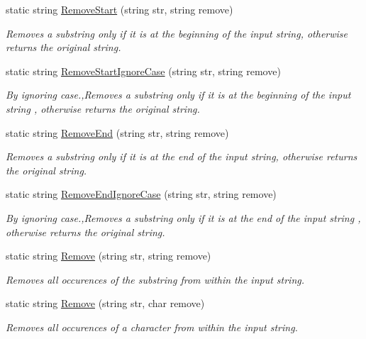 \begin{DoxyCompactItemize}
static string \hyperlink{class_ultimate_1_1_utilities_1_1_string_utils_a5d1a5075d3a15b54171c8b933ce1c494}{Remove\+Start} (string str, string remove)
\begin{DoxyCompactList}\small\item\em Removes a substring only if it is at the beginning of the input string, otherwise returns the original string. \end{DoxyCompactList}\item 
static string \hyperlink{class_ultimate_1_1_utilities_1_1_string_utils_ad31da1afd8821e096abcae497f0c4434}{Remove\+Start\+Ignore\+Case} (string str, string remove)
\begin{DoxyCompactList}\small\item\em By ignoring case.,Removes a substring only if it is at the beginning of the input string , otherwise returns the original string. \end{DoxyCompactList}\item 
static string \hyperlink{class_ultimate_1_1_utilities_1_1_string_utils_a05fdedfda5f6514866e5d73bbe214ce1}{Remove\+End} (string str, string remove)
\begin{DoxyCompactList}\small\item\em Removes a substring only if it is at the end of the input string, otherwise returns the original string. \end{DoxyCompactList}\item 
static string \hyperlink{class_ultimate_1_1_utilities_1_1_string_utils_a27d7f65090c06d9c0376caab6e301ecf}{Remove\+End\+Ignore\+Case} (string str, string remove)
\begin{DoxyCompactList}\small\item\em By ignoring case.,Removes a substring only if it is at the end of the input string , otherwise returns the original string. \end{DoxyCompactList}\item 
static string \hyperlink{class_ultimate_1_1_utilities_1_1_string_utils_a6da32f2a8e831ef0c1788f2f2927d723}{Remove} (string str, string remove)
\begin{DoxyCompactList}\small\item\em Removes all occurences of the substring from within the input string. \end{DoxyCompactList}\item 
static string \hyperlink{class_ultimate_1_1_utilities_1_1_string_utils_a83c2de023df73f0263c6818ade152caa}{Remove} (string str, char remove)
\begin{DoxyCompactList}\small\item\em Removes all occurences of a character from within the input string. \end{DoxyCompactList}\item 

\end{DoxyCompactItemize}
